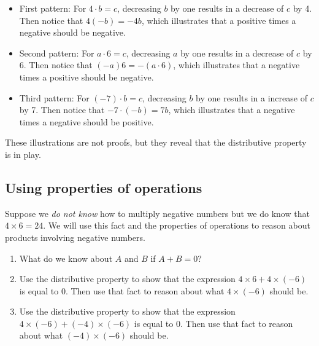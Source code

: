 \documentclass[nooutcomes]{ximera}
\begin{document}
\begin{problem}
\begin{teachingnote}
\begin{itemize}
\item First pattern:  For $4\cdot b = c$, decreasing $b$ by one results in a decrease of $c$ by 4.  Then notice that $4(-b) = -4b$, which illustrates that a positive times a negative should be negative. 
\item Second pattern:  For $a\cdot 6= c$, decreasing $a$ by one results in a decrease of $c$ by 6.  Then notice that $(-a)6 = -(a\cdot 6)$, which illustrates that a negative times a positive should be negative.  
\item Third pattern:  For $(-7)\cdot b= c$, decreasing $b$ by one results in a increase of $c$ by 7.  Then notice that $-7\cdot (-b) = 7b $, which illustrates that a negative times a negative should be positive. 
\end{itemize}
These illustrations are not proofs, but they reveal that the distributive property is in play.  
\end{teachingnote}
\end{problem}

\subsection*{Using properties of operations}

\begin{problem}
Suppose we \emph{do not know} how to multiply negative numbers but we do know that $4\times 6=24$. We will use this fact and the properties of operations to reason about products involving negative numbers.  
\begin{enumerate}
\item What do we know about $A$ and $B$ if $A+B=0$?  
\item Use the distributive property to show that the expression $4\times 6 + 4\times(-6)$ is equal to $0$.  
Then use that fact to reason about what $4\times(-6)$ should be.  
\item Use the distributive property to show that the expression $4\times (-6) + (-4)\times (-6)$ is equal to $0$.  
Then use that fact to reason about what $(-4)\times(-6)$ should be.  
\end{enumerate}
\end{problem}
\end{document}
